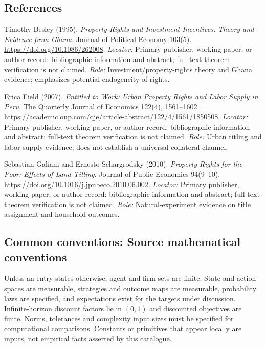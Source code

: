 \documentclass[11pt,a4paper]{article}
\begin{document}
\subsection*{References}
\begin{enumerate}[label=\textnormal{[S\arabic*]},leftmargin=*]
\item Timothy Besley (1995). \emph{Property Rights and Investment Incentives: Theory and Evidence from Ghana}. Journal of Political Economy 103(5). \url{https://doi.org/10.1086/262008}. \textit{Locator:} Primary publisher, working-paper, or author record: bibliographic information and abstract; full-text theorem verification is not claimed. \textit{Role:} Investment/property-rights theory and Ghana evidence; emphasizes potential endogeneity of rights.
\item Erica Field (2007). \emph{Entitled to Work: Urban Property Rights and Labor Supply in Peru}. The Quarterly Journal of Economics 122(4), 1561--1602. \url{https://academic.oup.com/qje/article-abstract/122/4/1561/1850508}. \textit{Locator:} Primary publisher, working-paper, or author record: bibliographic information and abstract; full-text theorem verification is not claimed. \textit{Role:} Urban titling and labor-supply evidence; does not establish a universal collateral channel.
\item Sebastian Galiani and Ernesto Schargrodsky (2010). \emph{Property Rights for the Poor: Effects of Land Titling}. Journal of Public Economics 94(9--10). \url{https://doi.org/10.1016/j.jpubeco.2010.06.002}. \textit{Locator:} Primary publisher, working-paper, or author record: bibliographic information and abstract; full-text theorem verification is not claimed. \textit{Role:} Natural-experiment evidence on title assignment and household outcomes.
\end{enumerate}

\subsection*{Common conventions: Source mathematical conventions}

Unless an entry states otherwise, agent and firm sets are finite. State and action spaces are measurable, strategies and outcome maps are measurable, probability laws are specified, and expectations exist for the targets under discussion. Infinite-horizon discount factors lie in $(0,1)$ and discounted objectives are finite. Norms, tolerances and complexity input sizes must be specified for computational comparisons. Constants or primitives that appear locally are inputs, not empirical facts asserted by this catalogue.
\end{document}
